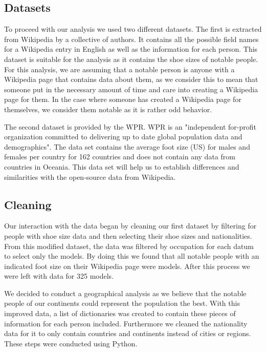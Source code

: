 \documentclass{article}
\begin{document}
\subsection{Datasets}
To proceed with our analysis we used two different datasets. The first is extracted from Wikipedia by a collective of authors. 
\cite{lehmann2015dbpedia}
It contains all the possible field names for a Wikipedia entry in English as well as the information for each person. This dataset is suitable for the analysis as it contains the shoe sizes of notable people.
For this analysis, we are assuming that a notable person is anyone with a Wikipedia page that contains data about them, as we consider this to mean that someone put in the necessary amount of time and care into creating a Wikipedia page for them. In the case where someone has created a Wikipedia page for themselves, we consider them notable as it is rather odd behavior.

The second dataset is provided by the WPR. WPR is an "independent for-profit organization committed to delivering up to date global population data and demographics". The data set contains the average foot size (US) for males and females per country for 162 countries and does not contain any data from countries in Oceania.
\cite{shoesizes}
This data set will help us to establish differences and similarities with the open-source data from Wikipedia. 

\subsection{Cleaning}
Our interaction with the data began by cleaning our first dataset by filtering for people with shoe size data and then selecting their shoe sizes and nationalities. From this modified dataset, the data was filtered by occupation for each datum to select only the models. By doing this we found that all notable people with an indicated foot size on their Wikipedia page were models. After this process we were left with data for 325 models.

We decided to conduct a geographical analysis as we believe that the notable people of our continents could represent the population the best. With this improved data, a list of dictionaries was created to contain these pieces of information for each person included. 
Furthermore we cleaned the nationality data for it  to only contain countries and continents instead of cities or regions. These steps were conducted using Python. 
\end{document}
